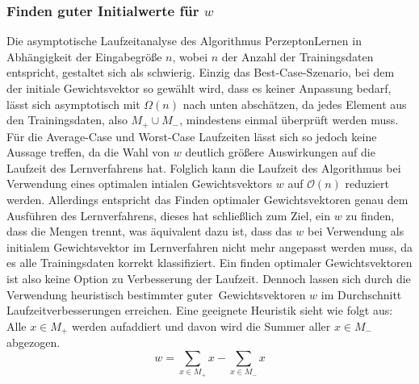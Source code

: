 \documentclass[fontsize=11pt]{scrartcl}
\begin{document}
                    \subsubsection{Finden guter Initialwerte für $w$}
                    Die asymptotische Laufzeitanalyse des Algorithmus PerzeptonLernen in Abhängigkeit der Eingabegröße $n$, wobei $n$ der Anzahl der Trainingsdaten entspricht, gestaltet sich als schwierig. Einzig das Best-Case-Szenario, bei dem der initiale Gewichtsvektor so gewählt wird, dass es keiner Anpassung bedarf, lässt sich asymptotisch mit $\Omega(n)$ nach unten abschätzen, da jedes Element aus den Trainingsdaten, also $M_+ \cup M_-$, mindestens einmal überprüft werden muss. Für die Average-Case und Worst-Case Laufzeiten lässt sich so jedoch keine Aussage treffen, da die Wahl von $w$ deutlich größere Auswirkungen auf die Laufzeit des Lernverfahrens hat.
                    Folglich kann die Laufzeit des Algorithmus bei Verwendung eines optimalen intialen Gewichtsvektors $w$ auf $\mathcal{O}(n)$ reduziert werden. Allerdings entspricht das Finden optimaler Gewichtsvektoren genau dem Ausführen des Lernverfahrens, dieses hat schließlich zum Ziel, ein $w$ zu finden, dass die Mengen trennt, was äquivalent dazu ist, dass das $w$ bei Verwendung als initialem Gewichtsvektor im Lernverfahren nicht mehr angepasst werden muss, da es alle Trainingsdaten korrekt klassifiziert.
                    Ein finden optimaler Gewichtsvektoren ist also keine Option zu Verbesserung der Laufzeit.
                    \newline
                    Dennoch lassen sich durch die Verwendung heuristisch bestimmter \glqq guter\grqq\  Gewichtsvektoren $w$ im Durchschnitt Laufzeitverbesserungen erreichen.
                    Eine geeignete Heuristik sieht wie folgt aus: 
                    \newline
                    Alle $x\in M_+$ werden aufaddiert und davon wird die Summer aller $x\in M_-$ abgezogen.
                    $$
                        w = \sum_{x \in M_+}x - \sum_{x \in M_-}x
                    $$\cite{ertel2016}
\end{document}
